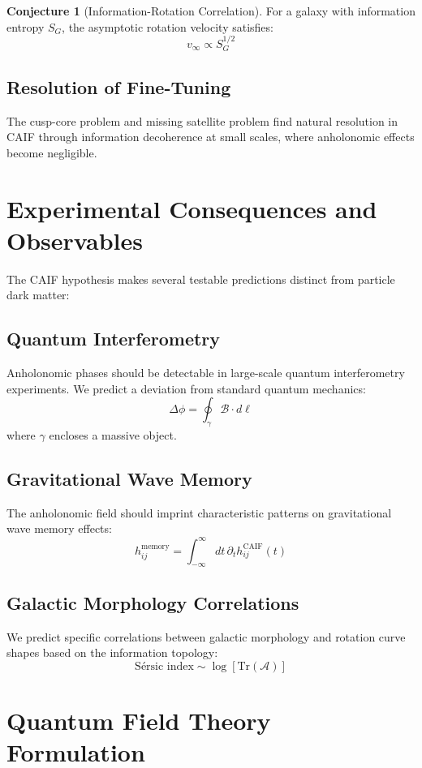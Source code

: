 \documentclass[11pt]{article}
\theoremstyle{definition}
\newtheorem{conjecture}{Conjecture}[section]
\theoremstyle{remark}
\begin{document}
\begin{conjecture}[Information-Rotation Correlation]
For a galaxy with information entropy \( S_G \), the asymptotic rotation velocity satisfies:
\[ v_{\infty} \propto S_G^{1/2} \]
\end{conjecture}

\subsection{Resolution of Fine-Tuning}
The cusp-core problem and missing satellite problem find natural resolution in CAIF through information decoherence at small scales, where anholonomic effects become negligible.

\section{Experimental Consequences and Observables}

The CAIF hypothesis makes several testable predictions distinct from particle dark matter:

\subsection{Quantum Interferometry}
Anholonomic phases should be detectable in large-scale quantum interferometry experiments. We predict a deviation from standard quantum mechanics:
\[ \Delta\phi = \oint_{\gamma} \mathcal{B} \cdot d\ell \]
where \( \gamma \) encloses a massive object.

\subsection{Gravitational Wave Memory}
The anholonomic field should imprint characteristic patterns on gravitational wave memory effects:
\[ h_{ij}^{\text{memory}} = \int_{-\infty}^{\infty} dt \, \partial_t h_{ij}^{\text{CAIF}}(t) \]

\subsection{Galactic Morphology Correlations}
We predict specific correlations between galactic morphology and rotation curve shapes based on the information topology:
\[ \text{Sérsic index} \sim \log[\text{Tr}(\mathcal{A})] \]

\section{Quantum Field Theory Formulation}
\end{document}

